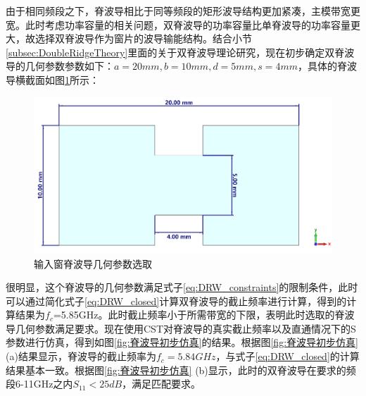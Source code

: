 \documentclass[master]{thesis-uestc}
\begin{document}
由于相同频段之下，脊波导相比于同等频段的矩形波导结构更加紧凑，主模带宽更宽。此时考虑功率容量的相关问题，双脊波导的功率容量比单脊波导的功率容量更大，故选择双脊波导作为窗片的波导输能结构。结合小节\ref{subsec:DoubleRidgeTheory}里面的关于双脊波导理论研究，现在初步确定双脊波导的几何参数参数如下：$a=20mm, b=10mm, d=5mm, s=4mm $，具体的脊波导横截面如图\ref{fig:6-11GHzDRW}所示：
\begin{figure}[!htb]
    \includegraphics[width=0.7\linewidth]{pic/chapter3/6-11GHzDRW.png}
    \caption{输入窗脊波导几何参数选取}
    \label{fig:6-11GHzDRW}
\end{figure}

很明显，这个脊波导的几何参数满足式子\ref{eq:DRW_constraints}的限制条件，此时可以通过简化式子\ref{eq:DRW_closed}计算双脊波导的截止频率进行计算，得到的计算结果为$f_c$=5.85GHz。此时截止频率小于所需带宽的下限，表明此时选取的脊波导几何参数满足要求。现在使用CST对脊波导的真实截止频率以及直通情况下的S参数进行仿真，得到如图\ref{fig:脊波导初步仿真}的结果。根据图\ref{fig:脊波导初步仿真} (a)结果显示，脊波导的截止频率为$f_c=5.84GHz$，与式子\ref{eq:DRW_closed}的计算结果基本一致。根据图\ref{fig:脊波导初步仿真} (b)显示，此时的双脊波导在要求的频段6-11GHz之内$S_{11}<25dB$，满足匹配要求。
\end{document}
